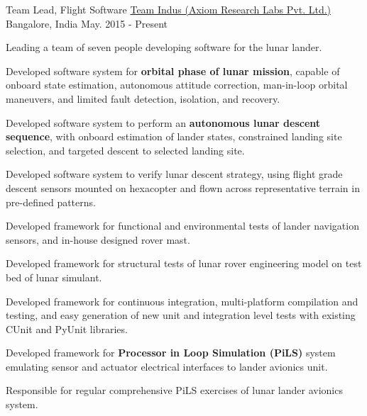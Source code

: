 \begin{cventries}
	\cventry
	{Team Lead, Flight Software}
	{\href{http://www.teamindus.in/}{Team Indus (Axiom Research Labs Pvt. Ltd.)}}
	{Bangalore, India}
	{May. 2015 - Present}
	{
		\begin{cvitems}
			\item{Leading a team of seven people developing software for the lunar lander.}
			\item{Developed software system for \textbf{orbital phase of lunar mission}, capable of onboard state estimation, autonomous attitude correction, man-in-loop orbital maneuvers, and limited fault detection, isolation, and recovery.}
			\item{Developed software system to perform an \textbf{autonomous lunar descent sequence}, with onboard estimation of lander states, constrained landing site selection, and targeted descent to selected landing site.}
			\item{Developed software system to verify lunar descent strategy, using flight grade descent sensors mounted on hexacopter and flown across representative terrain in pre-defined patterns.}
			\item{Developed framework for functional and environmental tests of lander navigation sensors, and in-house designed rover mast.}
			\item{Developed framework for structural tests of lunar rover engineering model on test bed of lunar simulant.}
			\item{Developed framework for continuous integration, multi-platform compilation and testing, and easy generation of new unit and integration level tests with existing CUnit and PyUnit libraries.}
			\item{Developed framework for \textbf{Processor in Loop Simulation (PiLS)} system emulating sensor and actuator electrical interfaces to lander avionics unit.}
			\item{Responsible for regular comprehensive PiLS exercises of lunar lander avionics system.}
		\end{cvitems}
	}


\end{cventries}
